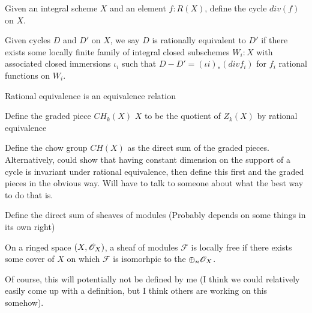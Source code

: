 \begin{definition}
  \label{def:principaldivisor}


  Given an integral scheme $X$ and an element $f : R(X)$, 
  define the cycle $div(f)$ on $X$.
\end{definition}

\begin{definition}
  \label{def:rationalequivalence}
  Given cycles $D$ and $D'$ on $X$, we say $D$ is rationally equivalent to $D'$ if there
  exists some locally finite family of integral closed subschemes $W_i : X$ with associated
  closed immersions $\iota_i$ such that $D - D' = (\iota i)_* (div f_i)$ for $f_i$ rational
  functions on $W_i$.
\end{definition}

\begin{lemma}
  \label{lem:ratequivisequiv}
  Rational equivalence is an equivalence relation
\end{lemma}

\begin{definition}
  \label{def:chowgroupgraded}
  Define the graded piece $CH_k(X)$ $X$ to be the quotient of $Z_k(X)$ by rational equivalence
\end{definition}

\begin{definition}
  \label{def:chowgroup}
  Define the chow group $CH(X)$ as the direct sum of the graded pieces. Alternatively,
  could show that having constant dimension on the support of a cycle is invariant under
  rational equivalence, then define this first and the graded pieces in the obvious way.
  Will have to talk to someone about what the best way to do that is.
\end{definition}

\begin{definition}
  \label{def:directsumsheafmodules}
  Define the direct sum of sheaves of modules (Probably depends on some things in its own right)
\end{definition}

\begin{definition}
  \label{def:locallyfreesheaf}
  On a ringed space $(X, \mathscr{O}_X)$, a sheaf of modules $\mathscr{F}$ is locally free if 
  there exists some cover of $X$ on which $\mathscr{F}$ is isomorhpic to the $\oplus_n \mathscr{O}_X$.

  Of course, this will potentially not be defined by me (I think we could relatively easily
  come up with a definition, but I think others are working on this somehow). 
\end{definition}

